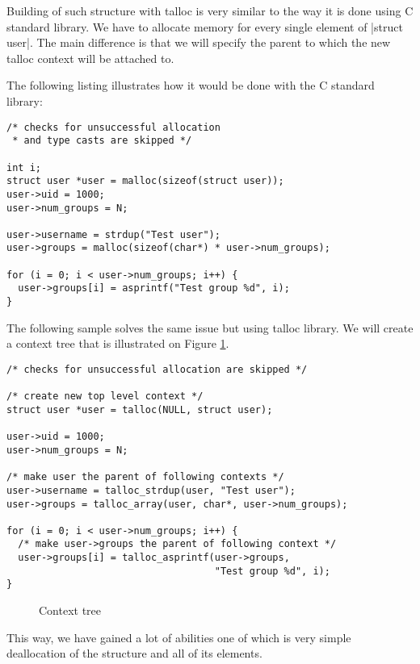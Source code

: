 Building of such structure with talloc is very similar to the way it is done
using C standard library. We have to allocate memory for every single element of
|struct user|. The main difference is that we will specify the parent to which
the new talloc context will be attached to.

The following listing illustrates how it would be done with the C standard
library:

\begin{lstlisting}[caption={Building struct user -- C standard library}]
/* checks for unsuccessful allocation
 * and type casts are skipped */

int i;
struct user *user = malloc(sizeof(struct user));
user->uid = 1000;
user->num_groups = N;

user->username = strdup("Test user");
user->groups = malloc(sizeof(char*) * user->num_groups);

for (i = 0; i < user->num_groups; i++) {
  user->groups[i] = asprintf("Test group %d", i);
}
\end{lstlisting}

\noindent
The following sample solves the same issue but using talloc library. We will
create a context tree that is illustrated on Figure
\ref{fig:context-tree-1-user}.

\begin{lstlisting}[caption={Building struct user -- talloc library},
morekeywords={talloc,talloc_strdup,talloc_array,talloc_asprintf}]
/* checks for unsuccessful allocation are skipped */

/* create new top level context */
struct user *user = talloc(NULL, struct user);

user->uid = 1000;
user->num_groups = N;

/* make user the parent of following contexts */
user->username = talloc_strdup(user, "Test user");
user->groups = talloc_array(user, char*, user->num_groups);

for (i = 0; i < user->num_groups; i++) {
  /* make user->groups the parent of following context */
  user->groups[i] = talloc_asprintf(user->groups,
                                    "Test group %d", i);
}
\end{lstlisting}

\begin{figure}[H]
  \centering
  
  \caption{Context tree}
  \label{fig:context-tree-1-user}
\end{figure}

This way, we have gained a lot of abilities one of which is very simple
deallocation of the structure and all of its elements.


